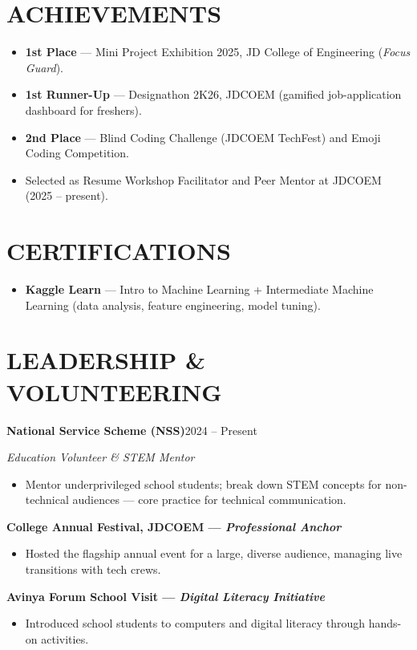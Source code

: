 \documentclass[10pt,letterpaper]{article}
\newenvironment{bul}
  {\begin{itemize}[leftmargin=1.15em,labelsep=0.4em,label=\textbullet,
                   itemsep=0pt,topsep=1pt,parsep=0pt,partopsep=0pt]}
  {\end{itemize}}
\newcommand{\entryhead}[2]{\par\vspace{2pt}\noindent\textbf{#1}\hfill{\small #2}\par\nopagebreak}
\begin{document}
\section{ACHIEVEMENTS}
\begin{bul}
  \item \textbf{1st Place} --- Mini Project Exhibition 2025, JD College of Engineering (\textit{Focus Guard}).
  \item \textbf{1st Runner-Up} --- Designathon 2K26, JDCOEM (gamified job-application dashboard for freshers).
  \item \textbf{2nd Place} --- Blind Coding Challenge (JDCOEM TechFest) and Emoji Coding Competition.
  \item Selected as Resume Workshop Facilitator and Peer Mentor at JDCOEM (2025 -- present).
\end{bul}

\section{CERTIFICATIONS}
\begin{bul}
  \item \textbf{Kaggle Learn} --- Intro to Machine Learning + Intermediate Machine Learning (data analysis, feature engineering, model tuning).
\end{bul}

\section{LEADERSHIP \& VOLUNTEERING}
\entryhead{National Service Scheme (NSS)}{2024 -- Present}
\textit{Education Volunteer \& STEM Mentor}
\begin{bul}
  \item Mentor underprivileged school students; break down STEM concepts for non-technical audiences --- core practice for technical communication.
\end{bul}

\entryhead{College Annual Festival, JDCOEM \textnormal{---} {\mdseries\itshape Professional Anchor}}{}
\begin{bul}
  \item Hosted the flagship annual event for a large, diverse audience, managing live transitions with tech crews.
\end{bul}

\entryhead{Avinya Forum School Visit \textnormal{---} {\mdseries\itshape Digital Literacy Initiative}}{}
\begin{bul}
  \item Introduced school students to computers and digital literacy through hands-on activities.
\end{bul}
\end{document}
